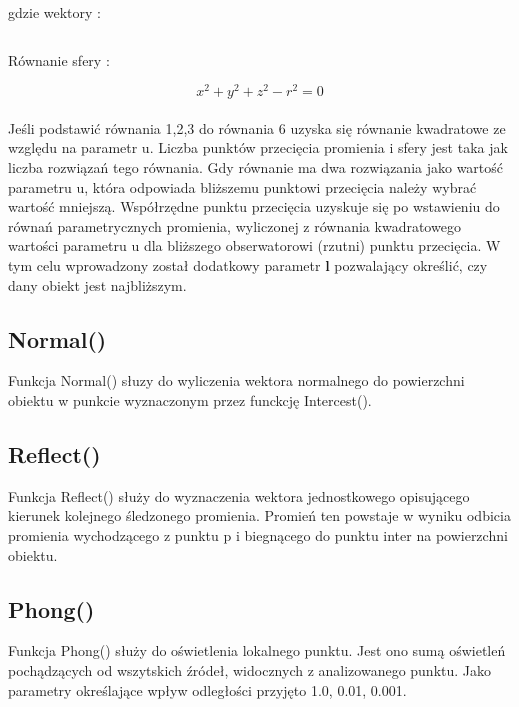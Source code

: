 \documentclass[wide,a4paper,titlepage,12pt] {article}
\begin{document}
gdzie wektory :

\begin{equation}
[ r_{0x} \ \ r_{0y} \ \ r_{0z} ]
\end{equation}
\begin{equation}
[ r_{dx} \ \ r_{dy} \ \ r_{dz} ]
\end{equation}

Równanie sfery : 

\begin{equation}
x^2 + y^2 + z^2 - r^2 = 0
\end{equation}
 
\paragraph{} %
\label{par:}
Jeśli podstawić równania 1,2,3 do równania 6  uzyska się równanie kwadratowe ze względu na parametr u. Liczba punktów przecięcia promienia i sfery jest taka jak liczba rozwiązań tego równania. Gdy równanie ma dwa rozwiązania jako wartość parametru u, która odpowiada bliższemu punktowi przecięcia należy wybrać wartość mniejszą. Współrzędne punktu przecięcia uzyskuje się po wstawieniu do równań parametrycznych promienia, wyliczonej z równania kwadratowego wartości parametru u dla bliższego obserwatorowi (rzutni) punktu przecięcia. W tym celu wprowadzony został dodatkowy parametr \textbf{l} pozwalający określić, czy dany obiekt jest najbliższym.



\subsection{Normal()}
Funkcja Normal() słuzy do wyliczenia wektora normalnego do powierzchni obiektu w punkcie wyznaczonym przez funckcję Intercest().

\subsection{Reflect()}
Funkcja Reflect() służy  do wyznaczenia wektora jednostkowego opisującego kierunek kolejnego śledzonego promienia. Promień ten powstaje w wyniku odbicia promienia wychodzącego z punktu p i biegnącego do punktu inter na powierzchni obiektu.


\subsection{Phong()}
Funkcja Phong() służy do oświetlenia lokalnego punktu. Jest ono sumą oświetleń pochądzących od wszytskich źródeł, widocznych z analizowanego punktu. Jako parametry określające wpływ odległości przyjęto 1.0, 0.01, 0.001.
\end{document}
